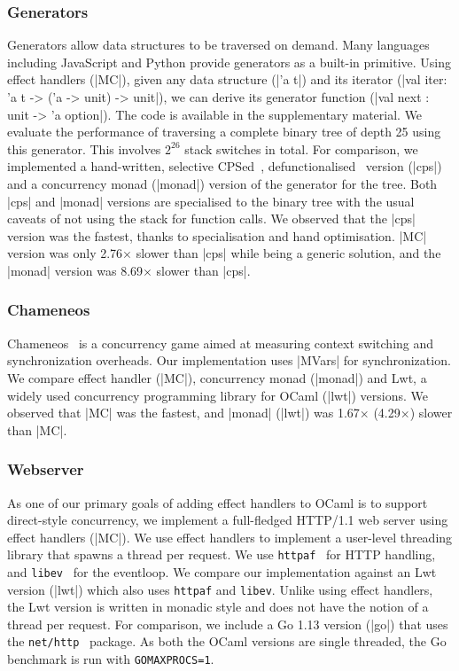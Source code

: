 \documentclass[sigplan,screen]{acmart}
\begin{document}
\subsubsection{Generators}

Generators allow data structures to be traversed on demand. Many languages
including JavaScript and Python provide generators as a built-in primitive.
Using effect handlers (|MC|), given any data structure (|'a t|) and its
iterator (|val iter: 'a t -> ('a -> unit) -> unit|), we can derive its
generator function (|val next : unit -> 'a option|). The code is available in
the supplementary material. We evaluate the performance of traversing a
complete binary tree of depth 25 using this generator. This involves $2^{26}$
stack switches in total. For comparison, we implemented a hand-written,
selective CPSed~\cite{Nielson01}, defunctionalised~\cite{Danvy01} version
(|cps|) and a concurrency monad (|monad|) version of the generator for the
tree. Both |cps| and |monad| versions are specialised to the binary tree with
the usual caveats of not using the stack for function calls. We observed that
the |cps| version was the fastest, thanks to specialisation and hand
optimisation. |MC| version was only 2.76$\times$ slower than |cps| while being
a generic solution, and the |monad| version was 8.69$\times$ slower than |cps|.

\subsubsection{Chameneos}

Chameneos~\cite{Chameneos} is a concurrency game aimed at measuring context
switching and synchronization overheads. Our implementation uses |MVars| for
synchronization. We compare effect handler (|MC|), concurrency monad (|monad|)
and Lwt, a widely used concurrency programming library for OCaml (|lwt|)
versions. We observed that |MC| was the fastest, and |monad| (|lwt|) was
1.67$\times$ (4.29$\times$) slower than |MC|.

\subsubsection{Webserver}

As one of our primary goals of adding effect handlers to OCaml is to support
direct-style concurrency, we implement a full-fledged HTTP/1.1 web server using
effect handlers (|MC|). We use effect handlers to implement a user-level
threading library that spawns a thread per request. We use
\texttt{httpaf}~\cite{httpaf} for HTTP handling, and
\texttt{libev}~\cite{libev} for the eventloop. We compare our implementation
against an Lwt version (|lwt|) which also uses \texttt{httpaf} and
\texttt{libev}. Unlike using effect handlers, the Lwt version is written in
monadic style and does not have the notion of a thread per request. For
comparison, we include a Go 1.13 version (|go|) that uses the
\texttt{net/http}~\cite{nethttp} package. As both the OCaml versions are single
threaded, the Go benchmark is run with \texttt{GOMAXPROCS=1}.
\end{document}
